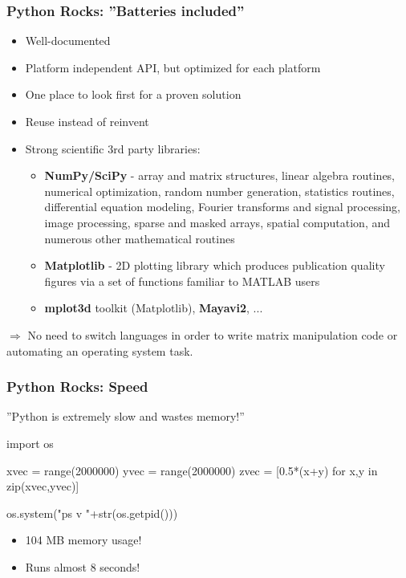 \documentclass[t,10pt,compress=false,usepdftitle=false]{beamer}
\begin{document}
\begin{frame}[fragile]
    \frametitle{Python Rocks: ''Batteries included''}
    \begin{itemize}
    	\item Well-documented
	\item Platform independent API, but optimized for each platform
	\item One place to look first for a proven solution
	\item Reuse instead of reinvent
	\pause
	\item Strong scientific 3rd party libraries:
        \begin{itemize}
	    \item \textbf{NumPy/SciPy} - array and matrix structures, linear algebra routines, numerical optimization, random number generation, statistics routines, differential equation modeling, Fourier transforms and signal processing, image processing, sparse and masked arrays, spatial computation, and numerous other mathematical routines
	    \item \textbf{Matplotlib} - 2D plotting library which produces publication quality figures via a set of functions familiar to MATLAB users
	    \item \textbf{mplot3d} toolkit (Matplotlib), \textbf{Mayavi2}, ...
        \end{itemize}
    \end{itemize}
    \pause
    $\Longrightarrow$ No need to switch languages in order to write matrix manipulation code or automating an operating system task.
\end{frame}


\begin{frame}[fragile]
    \frametitle{Python Rocks: Speed}
    ''Python is extremely slow and wastes memory!''
\begin{myColorBox}{0.9}{}
\begin{semiverbatim}
import os

xvec = range(2000000)
yvec = range(2000000)
zvec = [0.5*(x+y) for x,y in zip(xvec,yvec)]

os.system("ps v "+str(os.getpid()))
\end{semiverbatim}
\end{myColorBox}
    \begin{itemize}
    	\item 104 MB memory usage!
	\item Runs almost 8 seconds!
    \end{itemize}
\end{frame}
\end{document}
